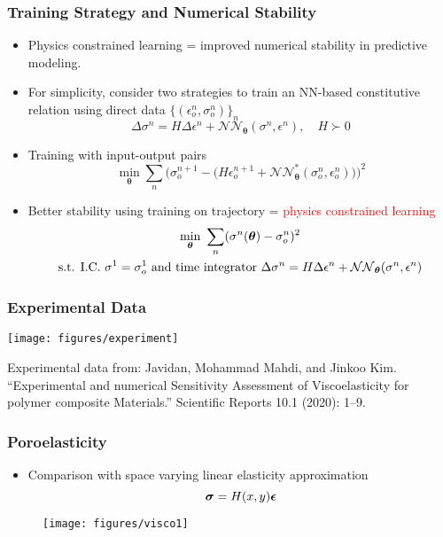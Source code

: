 \documentclass[usenames,dvipsnames]{beamer}
\newcommand{\bt}[0]{\bm{\theta}}
\begin{document}

\begin{frame}
	\frametitle{Training Strategy and Numerical Stability}
	
	\begin{itemize}
		\item Physics constrained learning = improved numerical stability in predictive modeling.
		\item For simplicity, consider two strategies to train an NN-based constitutive relation using direct data $\{(\epsilon_o^n, \sigma_o^n)\}_n$
		$$\Delta \sigma^n = H \Delta \epsilon^n + \mathcal{NN}_{\bt} (\sigma^n, \epsilon^n),\quad H \succ 0$$
		\item Training with input-output pairs
		$$\min_{\bt} \sum_n \Big(\sigma_o^{n+1} - \big(H\epsilon_o^{n+1} +  \mathcal{NN}_{\bt}^* (\sigma_o^n, \epsilon_o^n)\big) \Big)^2$$
		\item Better stability using training on trajectory = \textcolor{red}{physics constrained learning}
		\begin{gather*}
			\min_{\bt} \ \sum_n (\sigma^n(\bt) - \sigma_o^n)^2 \\
			\text{s.t. }\text{I.C.} \ \sigma^1 = \sigma^1_o \text{ and time integrator\ }
			{\small \Delta \sigma^n = H \Delta \epsilon^n + \mathcal{NN}_{\bt} (\sigma^n, \epsilon^n)}
		\end{gather*}
	\end{itemize}
\end{frame}

\begin{frame}
	\frametitle{Experimental Data}
	
	\texttt{[image: figures/experiment]}
	
	{\scriptsize Experimental data from: Javidan, Mohammad Mahdi, and Jinkoo Kim. ``Experimental and numerical Sensitivity Assessment of Viscoelasticity for polymer composite Materials.'' Scientific Reports 10.1 (2020): 1--9.}
	
\end{frame}




\begin{frame}
	\frametitle{Poroelasticity}
	
	\begin{itemize}
		\item Comparison with space varying linear elasticity approximation
		\begin{equation*}
			\bm{\sigma} = H(x, y) \bm{\epsilon}
		\end{equation*}
	\end{itemize}
	\begin{figure}[hbt]
		\texttt{[image: figures/visco1]}
	\end{figure}
	
\end{frame}
\end{document}
